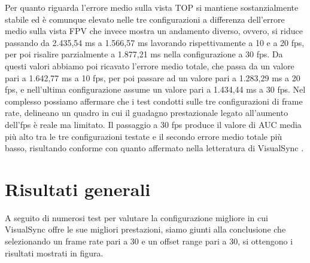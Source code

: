 Per quanto riguarda l'errore medio sulla vista TOP si mantiene sostanzialmente stabile ed è comunque elevato nelle tre configurazioni a differenza dell'errore medio sulla vista FPV che invece mostra un andamento diverso, ovvero, si riduce passando da 2.435,54 ms a 1.566,57 ms lavorando rispettivamente a 10 e a 20 fps, per poi risalire parzialmente a 1.877,21 ms nella configurazione a 30 fps. Da questi valori abbiamo poi ricavato l'errore medio totale, che passa da un valore pari a 1.642,77 ms a 10 fps, per poi passare ad un valore pari a 1.283,29 ms a 20 fps, e nell'ultima configurazione assume un valore pari a 1.434,44 ms a 30 fps.
Nel complesso possiamo affermare che i test condotti sulle tre configurazioni di frame rate, delineano un quadro in cui il guadagno prestazionale legato all'aumento dell'fps è reale ma limitato. Il passaggio a 30 fps produce il valore di AUC media più alto tra le tre configurazioni testate e il secondo errore medio totale più basso, risultando conforme con quanto affermato nella letteratura di VisualSync \cite{visualsync}.


\section{Risultati generali}
A seguito di numerosi test per valutare la configurazione migliore in cui VisualSync offre le sue migliori prestazioni, siamo giunti alla conclusione che selezionando un frame rate pari a 30 e un offset range pari a 30, si ottengono i risultati mostrati in figura.



